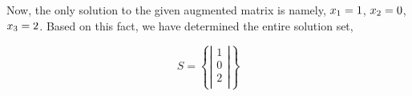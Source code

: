 \documentclass{article}
\begin{document}
\bigskip

Now, the only solution to the given augmented matrix is namely, \(x\textsubscript{1}=1\), \(x\textsubscript{2}=0\), \(x\textsubscript{3}=2\). Based on this fact, we have determined the entire solution set,

\[S=
\left\{
\left| \begin{array}{c}
1 \\
0 \\
2 \\
\end{array} \right|
\right\}
\]

\end{document}
